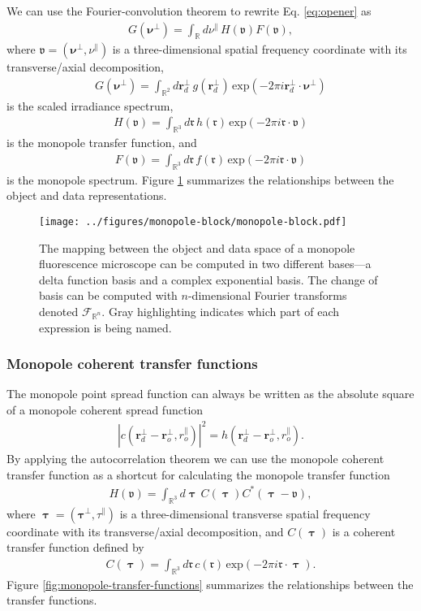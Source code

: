 \documentclass[]{osa-article}
\providecommand{\mf}[1]{\mathfrak{#1}}
\newcommand{\mypar}{\parallel}
\providecommand{\ropar}{r_o^{\mypar}}
\providecommand{\roperp}{\mathbf{r}_o^{\bot}}
\providecommand{\rd}{\mathbf{r}^{\bot}_d}
\providecommand{\mbb}[1]{\mathbb{#1}}
\providecommand{\bs}[1]{\boldsymbol{#1}}
\providecommand{\bv}{\boldsymbol{\mathfrak{v}}}
\providecommand{\bvperp}{\bs{\nu}^{\bot}}
\providecommand{\bvpar}{\nu^{\parallel}}
\providecommand{\bt}{\bs{\uptau}}
\providecommand{\btperp}{\bs{\tau}^{\bot}}
\providecommand{\btpar}{\tau^{\mypar}}
\begin{document}
We can use the Fourier-convolution theorem to rewrite Eq. \eqref{eq:opener} as
\begin{align}
  G(\bvperp) = \int_{\mbb{R}}d\bvpar\, H(\bv)F(\bv),
\end{align}
where $\bv = (\bvperp, \bvpar)$ is a three-dimensional spatial frequency coordinate with its transverse/axial decomposition, 
\begin{align}
  G(\bvperp) = \int_{\mbb{R}^2}d\rd\, g(\rd)\, \text{exp}(-2\pi i\rd\cdot\bvperp)
\end{align}
is the scaled irradiance spectrum,
\begin{align}
  H(\bv) = \int_{\mbb{R}^3}d\bs{\mf{r}}\, h(\bs{\mf{r}})\, \text{exp}(-2\pi i\bs{\mf{r}}\cdot\bv)
\end{align}
is the monopole transfer function, and
\begin{align}
  F(\bv) = \int_{\mbb{R}^3}d\bs{\mf{r}}\, f(\bs{\mf{r}})\, \text{exp}(-2\pi i\bs{\mf{r}}\cdot\bv)
\end{align}
is the monopole spectrum. Figure \ref{fig:monopole-block} summarizes the relationships between the object and data representations. 

\begin{figure}
  \centering
  \texttt{[image: ../figures/monopole-block/monopole-block.pdf]}
  \caption{
    The mapping between the object and data space of a monopole fluorescence microscope can be computed in two different bases---a delta function basis and a complex exponential basis. The change of basis can be computed with $n$-dimensional Fourier transforms denoted $\mathcal{F}_{\mbb{R}^n}$. Gray highlighting indicates which part of each expression is being named.
  }
  \label{fig:monopole-block}
\end{figure}

\subsubsection{Monopole coherent transfer functions}
The monopole point spread function can always be written as the absolute square of a monopole coherent spread function
\begin{align}
  |c(\rd - \roperp, \ropar)|^2 = h(\rd - \roperp, \ropar).
\end{align}
By applying the autocorrelation theorem we can use the monopole coherent transfer function as a shortcut for calculating the monopole transfer function
\begin{align}
  H(\bv) = \int_{\mbb{R}^3}d\bt\,C(\bt)C^*(\bt - \bv),
\end{align}
where $\bt = (\btperp, \btpar)$ is a three-dimensional transverse spatial frequency coordinate with its transverse/axial decomposition, and $C(\bt)$ is a coherent transfer function defined by
\begin{align}
  C(\bt) = \int_{\mbb{R}^3}d\bs{\mf{r}}\, c(\bs{\mf{r}})\,\text{exp}(-2\pi i\bs{\mf{r}}\cdot\bt).\label{eq:monoctf}
\end{align}
Figure \ref{fig:monopole-transfer-functions} summarizes the relationships between the transfer functions.  
\end{document}
